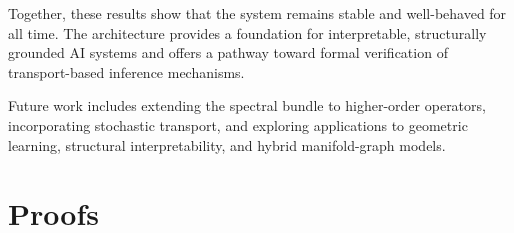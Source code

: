 \documentclass[11pt]{article}
\begin{document}
Together, these results show that the system remains stable and
well-behaved for all time. The architecture provides a foundation for
interpretable, structurally grounded AI systems and offers a pathway
toward formal verification of transport-based inference mechanisms.

Future work includes extending the spectral bundle to higher-order
operators, incorporating stochastic transport, and exploring applications
to geometric learning, structural interpretability, and hybrid
manifold-graph models.




\appendix
\section{Proofs}

\end{document}
